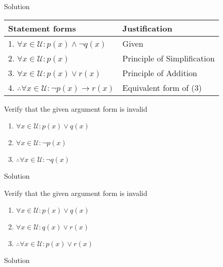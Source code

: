 Solution
\begin{table}[hbt!]
    \centering
    \begin{tabular}{|l | l|}
    \hline
    Statement forms & Justification\\ [0.5ex]
    \hline
        1. $\forall x \in \mathcal U: p(x) \land \neg q(x)$ & Given \\
        2. $\forall x \in \mathcal U: p(x)$ & Principle of Simplification \\
        3. $\forall x \in \mathcal U: p(x) \lor r(x)$ & Principle of Addition \\
        4. $\therefore \forall x \in \mathcal U: \neg p(x) \rightarrow r(x)$ & Equivalent form of (3) \\
    \hline
    \end{tabular}
\end{table}

\begin{longfbox}
    \begin{bt} \label{pro:practice2.39}
        Verify that the given argument form is invalid
        \begin{enumerate}
            \item[] $\forall x \in \mathcal U: p(x) \lor q(x)$
            \item[] $\forall x \in \mathcal U: \neg p(x)$
            \item[] $\therefore \forall x \in \mathcal U: \neg q(x)$
        \end{enumerate}
    \end{bt}
\end{longfbox}
Solution


\begin{longfbox}
    \begin{bt} \label{pro:practice2.40}
        Verify that the given argument form is invalid
        \begin{enumerate}
            \item[] $\forall x \in \mathcal U: p(x) \lor q(x)$
            \item[] $\forall x \in \mathcal U: q(x) \lor r(x)$
            \item[] $\therefore \forall x \in \mathcal U: p(x) \lor r(x)$
        \end{enumerate}
    \end{bt}
\end{longfbox}
Solution



